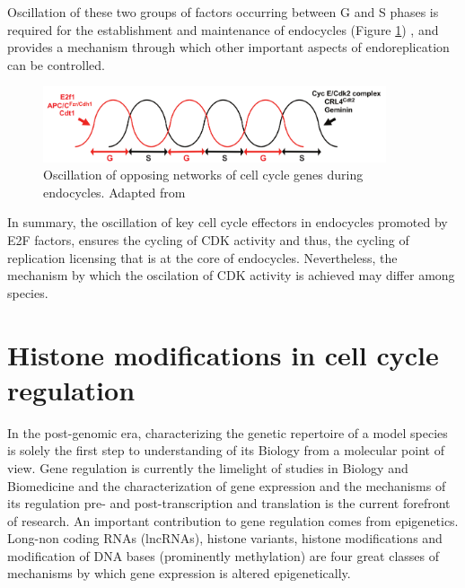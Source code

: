 \documentclass[11pt,twoside,a4paper]{report}
\begin{document}
				Oscillation of these two groups of factors occurring between G and S phases is required for the establishment and maintenance of endocycles (Figure \ref{fig:oscillation}) \cite{VandenHeuvel2008}\cite{Meserve2012}\cite{Fox2013}, and provides a mechanism through which other important aspects of endoreplication can be controlled.
				
				\begin{figure}[here]
					\centering
					\includegraphics[width=0.9\textwidth]{pngs/oscilation.png}
					\caption[Oscillation of opposing networks of cell cycle genes during endocycles]
					{Oscillation of opposing networks of cell cycle genes during endocycles. {\footnotesize Adapted from \cite{Fox2013}}}
					\label{fig:oscillation}
					\vspace{-10pt}
				\end{figure}
								
				In summary, the oscillation of key cell cycle effectors in endocycles promoted by E2F factors, ensures the cycling of CDK activity and thus, the cycling of replication licensing that is at the core of endocycles. Nevertheless, the mechanism by which the oscilation of CDK activity is achieved may differ among species.

	\clearpage
	\section{Histone modifications in cell cycle regulation}
	In the post-genomic era, characterizing the genetic repertoire of a model species is solely the first step to understanding of its Biology from a molecular point of view. Gene regulation is currently the limelight of studies in Biology and Biomedicine and the characterization of gene expression and the mechanisms of its regulation pre- and post-transcription and translation is the current forefront of research. An important contribution to gene regulation comes from epigenetics. Long-non coding RNAs (lncRNAs), histone variants, histone modifications and modification of DNA bases (prominently methylation) are four great classes of mechanisms by which gene expression is altered epigenetically. 
		
\end{document}
